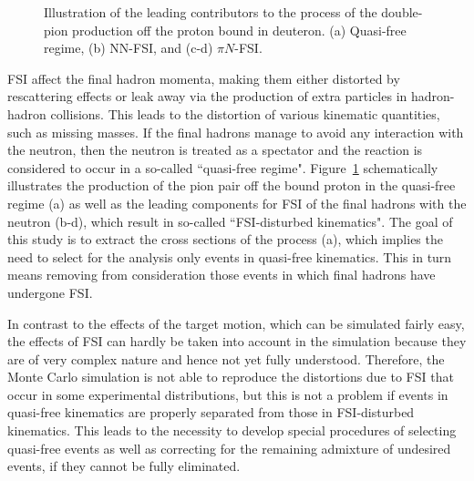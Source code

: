 \begin{figure}[!ht]
\begin{center}
\end{center}
\caption{\small Illustration of the leading contributors to the process of the double-pion production off the proton bound in deuteron. (a) Quasi-free regime, (b) NN-FSI, and (c-d) $\pi N$-FSI.}
\label{fig:fsi_mech}
\end{figure}

FSI affect the final hadron momenta, making them either distorted by rescattering effects or leak away via the production of extra particles in hadron-hadron collisions. This leads to the distortion of various kinematic quantities, such as missing masses. If the final hadrons manage to avoid any interaction with the neutron, then the neutron is treated as a spectator and the reaction is considered to occur in a so-called ``quasi-free regime". Figure~\ref{fig:fsi_mech} schematically illustrates the production of the pion pair off the bound proton in the quasi-free regime (a) as well as the leading components for FSI of the final hadrons with the neutron (b-d), which result in so-called ``FSI-disturbed kinematics". The goal of this study is to extract the cross sections of the process (a), which implies the need to select for the analysis only events in quasi-free kinematics. This in turn means removing from consideration those events in which final hadrons have undergone FSI.



In contrast to the effects of the target motion, which can be simulated fairly easy, the effects of FSI can hardly be taken into account in the simulation because they are of very complex nature and hence not yet fully understood. Therefore, the Monte Carlo simulation is not able to reproduce the distortions due to FSI that occur in some experimental distributions, but this is not a problem if events in quasi-free kinematics are properly separated from those in FSI-disturbed kinematics. This leads to the necessity to develop special procedures of selecting quasi-free events as well as correcting for the remaining admixture of undesired events, if they cannot be fully eliminated.

